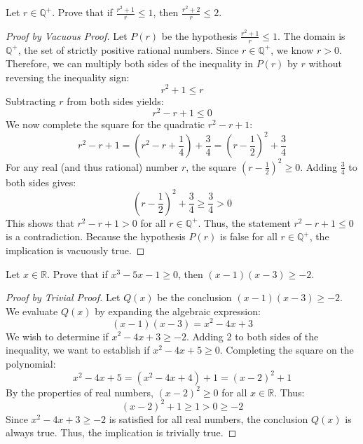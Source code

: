 \documentclass[11pt]{article}
\theoremstyle{remark}
\begin{document}
\begin{problem}[3.3]
Let $r \in \mathbb{Q}^+$. Prove that if $\frac{r^2 + 1}{r} \le 1$, then $\frac{r^2 + 2}{r} \le 2$.
\end{problem}
\begin{proof}[Proof by Vacuous Proof]
Let $P(r)$ be the hypothesis $\frac{r^2 + 1}{r} \le 1$. The domain is $\mathbb{Q}^+$, the set of strictly positive rational numbers. 
Since $r \in \mathbb{Q}^+$, we know $r > 0$. Therefore, we can multiply both sides of the inequality in $P(r)$ by $r$ without reversing the inequality sign:
\[ r^2 + 1 \le r \]
Subtracting $r$ from both sides yields:
\[ r^2 - r + 1 \le 0 \]
We now complete the square for the quadratic $r^2 - r + 1$:
\[ r^2 - r + 1 = \left(r^2 - r + \frac{1}{4}\right) + \frac{3}{4} = \left(r - \frac{1}{2}\right)^2 + \frac{3}{4} \]
For any real (and thus rational) number $r$, the square $\left(r - \frac{1}{2}\right)^2 \ge 0$. Adding $\frac{3}{4}$ to both sides gives:
\[ \left(r - \frac{1}{2}\right)^2 + \frac{3}{4} \ge \frac{3}{4} > 0 \]
This shows that $r^2 - r + 1 > 0$ for all $r \in \mathbb{Q}^+$. Thus, the statement $r^2 - r + 1 \le 0$ is a contradiction. Because the hypothesis $P(r)$ is false for all $r \in \mathbb{Q}^+$, the implication is vacuously true.
\end{proof}

\begin{problem}[3.4]
Let $x \in \mathbb{R}$. Prove that if $x^3 - 5x - 1 \ge 0$, then $(x - 1)(x - 3) \ge -2$.
\end{problem}
\begin{proof}[Proof by Trivial Proof]
Let $Q(x)$ be the conclusion $(x - 1)(x - 3) \ge -2$. We evaluate $Q(x)$ by expanding the algebraic expression:
\[ (x - 1)(x - 3) = x^2 - 4x + 3 \]
We wish to determine if $x^2 - 4x + 3 \ge -2$. Adding 2 to both sides of the inequality, we want to establish if $x^2 - 4x + 5 \ge 0$.
Completing the square on the polynomial:
\[ x^2 - 4x + 5 = (x^2 - 4x + 4) + 1 = (x - 2)^2 + 1 \]
By the properties of real numbers, $(x - 2)^2 \ge 0$ for all $x \in \mathbb{R}$. Thus:
\[ (x - 2)^2 + 1 \ge 1 > 0 \ge -2 \]
Since $x^2 - 4x + 3 \ge -2$ is satisfied for all real numbers, the conclusion $Q(x)$ is always true. Thus, the implication is trivially true.
\end{proof}
\end{document}
